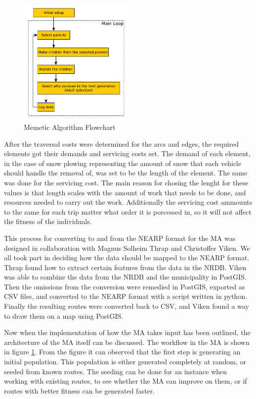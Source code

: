 \begin{figure}
	\begin{center}
		\includegraphics[width=0.5\textwidth]{figures/Architecture/MA_flowchart.pdf}
	\end{center}
	\caption{Memetic Algorithm Flowchart}
	\label{fig:ma_flowchart}
\end{figure}

After the traversal costs were determined for the arcs and edges, the required elements got their demands and servicing costs set. The demand of each element, in the case of snow plowing representing the amount of snow that each vehicle should handle the removal of, was set to be the length of the element. The same was done for the servicing cost. The main reason for chosing the lenght for these values is that length scales with the amount of work that needs to be done, and resources needed to carry out the work. Additionally the servicing cost ammounts to the same for each trip matter what order it is porcessed in, so it will not affect the fitness of the individuals.

This process for converting to and from the NEARP format for the MA was designed in collaboration with Magnus Solheim Thrap and Christoffer Viken. We all took part in deciding how the data should be mapped to the NEARP format. Thrap found how to extract certain features from the data in the NRDB. Viken was able to combine the data from the NRDB and the municipality in PostGIS. Then the omissions from the conversion were remedied in PostGIS, exported as CSV files, and converted to the NEARP format with a script written in python. Finally the resulting routes were converted back to CSV, and Viken found a way to draw them on a map using PostGIS.

Now when the implementation of how the MA takes input has been outlined, the architecture of the MA itself can be discussed. The workflow in the MA is shown in figure \ref{fig:ma_flowchart}. From the figure it can observed that the first step is generating an initial population. This population is either generated completely at random, or seeded from known routes. The seeding can be done for an instance when working with existing routes, to see whether the MA can improve on them, or if routes with better fitness can be generated faster.


